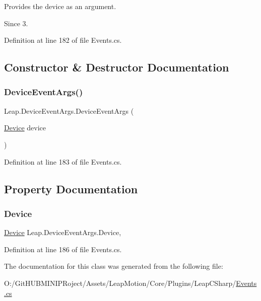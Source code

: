 Provides the device as an argument. \begin{DoxySince}{Since}
3. 
\end{DoxySince}


Definition at line 182 of file Events.\+cs.



\subsection{Constructor \& Destructor Documentation}
\mbox{\label{class_leap_1_1_device_event_args_a3c4a894a009ac62e7b804d760aa6f055}} 
\subsubsection{\texorpdfstring{DeviceEventArgs()}{DeviceEventArgs()}}
{\footnotesize\ttfamily Leap.\+Device\+Event\+Args.\+Device\+Event\+Args (\begin{DoxyParamCaption}\item[{\mbox{\hyperlink{class_leap_1_1_device}{Device}}}]{device }\end{DoxyParamCaption})}



Definition at line 183 of file Events.\+cs.



\subsection{Property Documentation}
\mbox{\label{class_leap_1_1_device_event_args_ad60b9dc8b48025359695a1e4774184bd}} 
\subsubsection{\texorpdfstring{Device}{Device}}
{\footnotesize\ttfamily \mbox{\hyperlink{class_leap_1_1_device}{Device}} Leap.\+Device\+Event\+Args.\+Device\hspace{0.3cm}{\ttfamily [get]}, {\ttfamily [set]}}



Definition at line 186 of file Events.\+cs.



The documentation for this class was generated from the following file\+:\begin{DoxyCompactItemize}
\item 
O\+:/\+Git\+H\+U\+B\+M\+I\+N\+I\+P\+Roject/\+Assets/\+Leap\+Motion/\+Core/\+Plugins/\+Leap\+C\+Sharp/\mbox{\hyperlink{_events_8cs}{Events.\+cs}}\end{DoxyCompactItemize}
